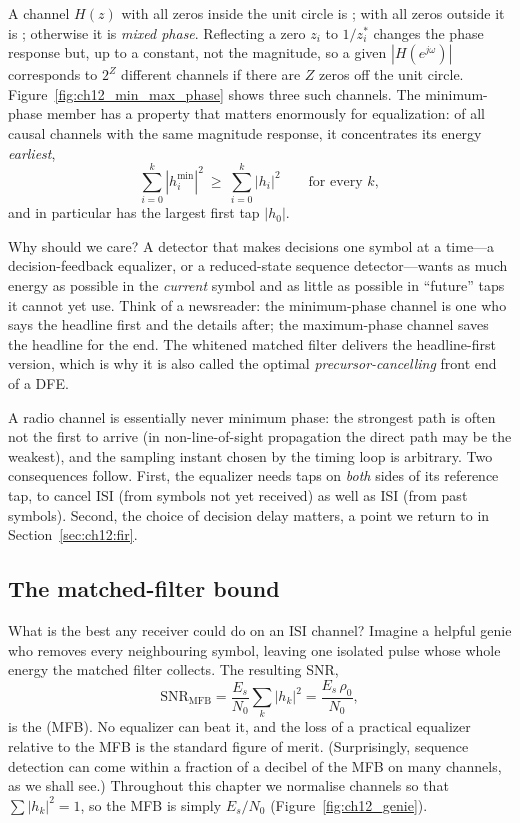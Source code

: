 A channel $H(z)$ with all zeros inside the unit circle is ; with all zeros
outside it is ; otherwise it is \emph{mixed phase}. Reflecting a zero $z_i$ to
$1/z_i^*$ changes the phase response but, up to a constant, not the magnitude, so a given
$|H(e^{j\omega})|$ corresponds to $2^{Z}$ different channels if there are $Z$ zeros off the unit
circle. Figure~\ref{fig:ch12_min_max_phase} shows three such channels. The minimum-phase member
has a property that matters enormously for equalization: of all causal channels with the same
magnitude response, it concentrates its energy \emph{earliest},
\begin{equation}
\sum_{i=0}^{k}|h_i^{\min}|^2\ \ge\ \sum_{i=0}^{k}|h_i|^2\qquad\text{for every }k,
\end{equation}
and in particular has the largest first tap $|h_0|$.

Why should we care? A detector that makes decisions one symbol at a time---a decision-feedback
equalizer, or a reduced-state sequence detector---wants as much energy as possible in the
\emph{current} symbol and as little as possible in ``future'' taps it cannot yet use. Think of a
newsreader: the minimum-phase channel is one who says the headline first and the details after;
the maximum-phase channel saves the headline for the end. The whitened matched filter delivers
the headline-first version, which is why it is also called the optimal \emph{precursor-cancelling}
front end of a DFE.

A radio channel is essentially never minimum phase: the strongest path is often not the first to
arrive (in non-line-of-sight propagation the direct path may be the weakest), and the sampling
instant chosen by the timing loop is arbitrary. Two consequences follow. First, the equalizer
needs taps on \emph{both} sides of its reference tap, to cancel  ISI (from symbols
not yet received) as well as  ISI (from past symbols). Second, the choice of
decision delay matters, a point we return to in Section~\ref{sec:ch12:fir}.

\subsection{The matched-filter bound}

What is the best any receiver could do on an ISI channel? Imagine a helpful genie who removes
every neighbouring symbol, leaving one isolated pulse whose whole energy the matched filter
collects. The resulting SNR,
\begin{equation}
\mathrm{SNR}_{\mathrm{MFB}}=\frac{E_s}{N_0}\sum_k|h_k|^2=\frac{E_s\,\rho_0}{N_0},
\label{eq:ch12:mfb}
\end{equation}
is the  (MFB). No equalizer can beat it, and the loss of a practical
equalizer relative to the MFB is the standard figure of merit. (Surprisingly, sequence detection
can come within a fraction of a decibel of the MFB on many channels, as we shall see.) Throughout
this chapter we normalise channels so that $\sum|h_k|^2=1$, so the MFB is simply $E_s/N_0$
(Figure~\ref{fig:ch12_genie}).

